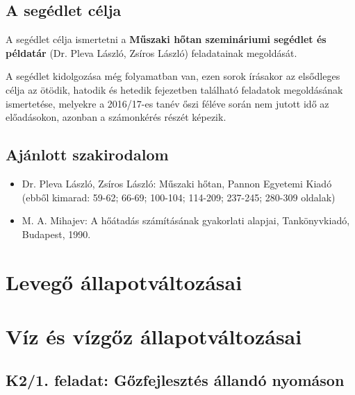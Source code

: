 \documentclass[11pt, a4paper]{report}
\begin{document}
\section*{A segédlet célja}

A segédlet célja ismertetni a \textbf{Műszaki hőtan szemináriumi segédlet és példatár} (Dr. Pleva László, Zsíros László) feladatainak megoldását.

A segédlet kidolgozása még folyamatban van, ezen sorok írásakor az elsődleges célja az ötödik, hatodik és hetedik fejezetben található feladatok megoldásának ismertetése, melyekre a 2016/17-es tanév őszi féléve során nem jutott idő az előadásokon, azonban a számonkérés részét képezik.


\section*{Ajánlott szakirodalom}

\begin{itemize}
	\item Dr. Pleva László, Zsíros László: Műszaki hőtan, Pannon Egyetemi Kiadó (ebből kimarad: 59-62; 66-69; 100-104; 114-209; 237-245; 280-309 oldalak)
	\item M. A. Mihajev: A hőátadás számításának gyakorlati alapjai, Tankönyvkiadó, Budapest, 1990.
\end{itemize}


\chapter{Levegő állapotváltozásai}




\chapter{Víz és vízgőz állapotváltozásai}

\section*{K2/1. feladat: Gőzfejlesztés állandó nyomáson}


\end{document}
